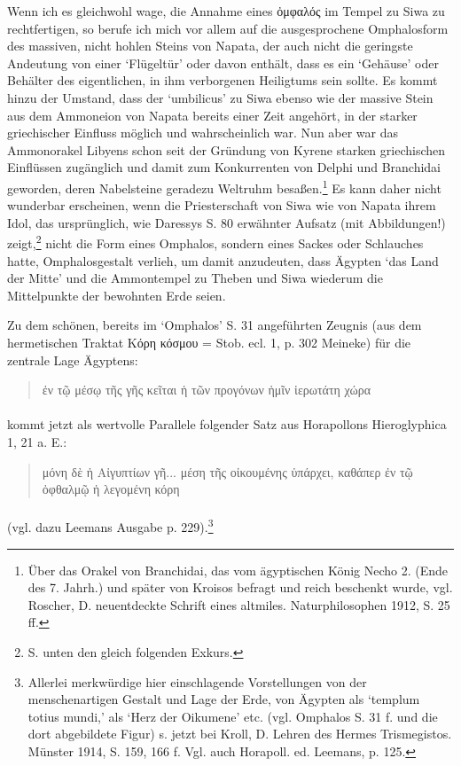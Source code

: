 \documentclass[a4paper, 11pt, oneside]{article}
\begin{document}
Wenn ich es gleichwohl wage, die Annahme eines ὀμφαλός im Tempel zu Siwa zu rechtfertigen, so berufe ich mich vor allem auf die ausgesprochene Omphalosform des massiven, nicht hohlen Steins von Napata, der auch nicht die geringste Andeutung von einer `Flügeltür' oder davon enthält, dass es ein `Gehäuse' oder Behälter des eigentlichen, in ihm verborgenen Heiligtums sein sollte. Es kommt hinzu der Umstand, dass der `umbilicus' zu Siwa ebenso wie der massive Stein aus dem Ammoneion von Napata bereits einer Zeit angehört, in der starker griechischer Einfluss möglich und wahrscheinlich war. Nun aber war das Ammonorakel Libyens schon seit der Gründung von Kyrene starken griechischen Einflüssen zugänglich und damit zum Konkurrenten von Delphi und Branchidai geworden, deren Nabelsteine geradezu Weltruhm besaßen.\footnote{Über das Orakel von Branchidai, das vom ägyptischen König Necho 2. (Ende des 7. Jahrh.) und später von Kroisos befragt und reich beschenkt wurde, vgl. Roscher, D. neuentdeckte Schrift eines altmiles. Naturphilosophen 1912, S. 25 ff.} Es kann daher nicht wunderbar erscheinen, wenn die Priesterschaft von Siwa wie von Napata ihrem Idol, das ursprünglich, wie Daressys S. 80 erwähnter Aufsatz (mit Abbildungen!) zeigt,\footnote{S. unten den gleich folgenden Exkurs.} nicht die Form eines Omphalos, sondern eines Sackes oder Schlauches hatte, Omphalosgestalt verlieh, um damit anzudeuten, dass Ägypten `das Land der Mitte' und die Ammontempel zu Theben und Siwa wiederum die Mittelpunkte der bewohnten Erde seien.

Zu dem schönen, bereits im `Omphalos' S. 31 angeführten Zeugnis (aus dem hermetischen Traktat Κόρη κόσμου = Stob. ecl. 1, p. 302 Meineke) für die zentrale Lage Ägyptens:
\begin{quotation}
ἐν τῷ μέσῳ τῆς γῆς κεῖται ἡ τῶν προγόνων ἡμῖν ἱερωτάτη χώρα
\end{quotation}
\paragraph{}
kommt jetzt als wertvolle Parallele folgender Satz aus Horapollons Hieroglyphica 1, 21 a. E.:
\begin{quotation}
μόνη δὲ ἡ Αἰγυπτίων γῆ... μέση τῆς οἰκουμένης ὑπάρχει, καθάπερ ἐν τῷ ὀφθαλμῷ ἡ λεγομένη κόρη
\end{quotation}
\paragraph{}
(vgl. dazu Leemans Ausgabe p. 229).\footnote{Allerlei merkwürdige hier einschlagende Vorstellungen von der menschenartigen Gestalt und Lage der Erde, von Ägypten als `templum totius mundi,' als `Herz der Oikumene' etc. (vgl. Omphalos S. 31 f. und die dort abgebildete Figur) s. jetzt bei Kroll, D. Lehren des Hermes Trismegistos. Münster 1914, S. 159, 166 f. Vgl. auch Horapoll. ed. Leemans, p. 125.}
\end{document}
